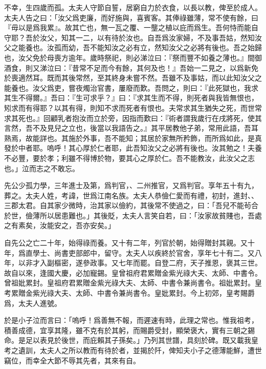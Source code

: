 不幸，生四歲而孤。太夫人守節自誓，居窮自力於衣食，以長以教，俾至於成人。太夫人告之曰：「汝父爲吏廉，而好施與，喜賓客。其俸祿雖薄，常不使有餘，曰『毋以是爲我累』。故其亡也，無一瓦之覆、一壟之植以庇而爲生。吾何恃而能自守耶？吾於汝父，知其一二，以有待於汝也。自吾爲汝家婦，不及事吾姑，然知汝父之能養也。汝孤而幼，吾不能知汝之必有立，然知汝父之必將有後也。吾之始歸也，汝父免於母喪方逾年。歲時祭祀，則必涕泣曰：『祭而豐不如養之薄也。』間御酒食，則又涕泣曰：『昔常不足而今有餘，其何及也！』吾始一二見之，以爲新免於喪適然耳。既而其後常然，至其終身未嘗不然。吾雖不及事姑，而以此知汝父之能養也。汝父爲吏，嘗夜燭治官書，屢廢而歎。吾問之，則曰：『此死獄也，我求其生不得爾。』吾曰：『生可求乎？』曰：『求其生而不得，則死者與我皆無恨也，矧求而有得耶？以其有得，則知不求而死者有恨也。夫常求其生猶失之死，而世常求其死也。』回顧乳者抱汝而立於旁，因指而歎曰：『術者謂我歲行在戌將死，使其言然，吾不及見兒之立也，後當以我語告之。』其平居教他子弟，常用此語，吾耳熟焉，故能詳也。其施於外事，吾不能知；其居於家無所矜飾，而所爲如此，是真發於中者耶。嗚呼！其心厚於仁者耶，此吾知汝父之必將有後也。汝其勉之！夫養不必豐，要於孝；利雖不得博於物，要其心之厚於仁。吾不能教汝，此汝父之志也。」泣而志之不敢忘。

先公少孤力學，三年進士及第，爲判官，、二州推官，又爲判官。享年五十有九，葬之。太夫人姓，考諱，世爲江南名族。太夫人恭儉仁愛而有禮，初封，進封、、三郡太君。自其家少微時，治其家以儉約，其後常不使過之，曰：「吾兒不能茍合於世，儉薄所以居患難也。」其後貶，太夫人言笑自若，曰：「汝家故貧賤也，吾處之有素矣，汝能安之，吾亦安矣。」

自先公之亡二十年，始得祿而養。又十有二年，列官於朝，始得贈封其親。又十年，爲直學士、尚書吏部郎中，留守。太夫人以疾終於官舍，享年七十有二。又八年，以非才入副樞密，遂參政事。又七年而罷。自登二府，天子推恩，褒其三世。故自以來，逢國大慶，必加寵錫。皇曾祖府君累贈金紫光祿大夫、太師、中書令。曾祖妣累封。皇祖府君累贈金紫光祿大夫、太師、中書令兼尚書令。祖妣累封。皇考累贈金紫光祿大夫、太師、中書令兼尚書令。皇妣累封。今上初郊，皇考賜爵爲，太夫人進號。

於是小子泣而言曰：「嗚呼！爲善無不報，而遲速有時，此理之常也。惟我祖考，積善成德，宜享其隆，雖不克有於其躬，而賜爵受封，顯榮褒大，實有三朝之錫命。是足以表見於後世，而庇賴其子孫矣。」乃列其世譜，具刻於碑。既又載我皇考之遺訓，太夫人之所以教而有待於者，並揭於阡，俾知夫小子之德薄能鮮，遭世竊位，而幸全大節不辱其先者，其來有自。

